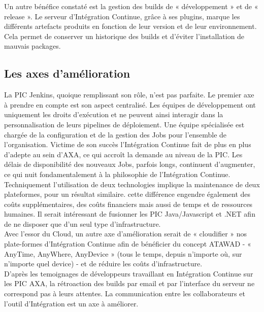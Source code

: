     Un autre bénéfice constaté est la gestion des builds de « développement » et de « release ». Le serveur d'Intégration Continue, grâce à ses plugins, marque les différents artefacts produits en fonction de leur version et de leur environnement. Cela permet de conserver un historique des builds et d'éviter l'installation de mauvais packages.\\

    \subsection{Les axes d'amélioration}
    La PIC Jenkins, quoique remplissant son rôle, n'est pas parfaite. Le premier axe à prendre en compte est son aspect centralisé. Les équipes de développement ont uniquement les droits d'exécution et ne peuvent ainsi interagir dans la personnalisation de leurs pipelines de déploiement. Une équipe spécialisée est chargée de la configuration et de la gestion des Jobs pour l'ensemble de l'organisation. Victime de son succès l'Intégration Continue fait de plus en plus d'adepte au sein d'AXA, ce qui accroît la demande au niveau de la PIC. Les délais de disponibilité des nouveaux Jobs, parfois longs, continuent d'augmenter, ce qui nuit fondamentalement à la philosophie de l'Intégration Continue.\\

    Techniquement l'utilisation de deux technologies implique la maintenance de deux plateformes, pour un résultat similaire. cette différence engendre également des coûts supplémentaires, des coûts financiers mais aussi de temps et de ressources humaines. Il serait intéressant de fusionner les PIC Java/Javascript et .NET afin de ne disposer que d'un seul type d'infrastructure.\\

    Avec l'essor du Cloud, un autre axe d'amélioration serait de « cloudifier » nos plate-formes d'Intégration Continue afin de bénéficier du concept ATAWAD - « AnyTime, AnyWhere, AnyDevice » (tous le temps, depuis n'importe où, sur n'importe quel device) - et de réduire les coûts d'infrastructure.\\

    D'après les temoignages de développeurs travaillant en Intégration Continue sur les PIC AXA, la rétroaction des builds par email et par l'interface du serveur ne correspond pas à leurs attentes. La communication entre les collaborateurs et l'outil d'Intégration est un axe à améliorer.
